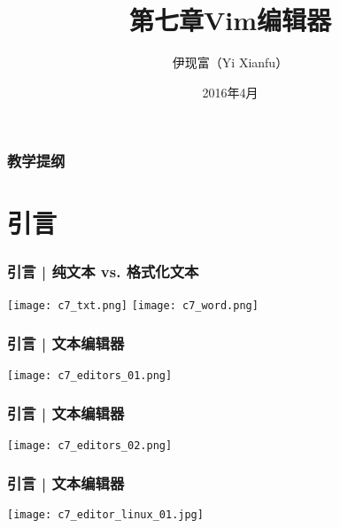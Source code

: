 



\title[Vim]{第七章\quad Vim编辑器}
\author[Yixf]{伊现富（Yi Xianfu）}
\date{2016年4月}


\begin{frame}
  \titlepage
\end{frame}

\begin{frame}[plain,label=current]
  \frametitle{教学提纲}
  \setcounter{tocdepth}{3}
  \begin{multicols}{2}
    \tableofcontents
  \end{multicols}
\end{frame}


\section{引言}
\begin{frame}
  \frametitle{引言 | 纯文本 vs. 格式化文本}
  \begin{center}
    \texttt{[image: c7\_txt.png]}
    \vspace*{0.1cm}
    \texttt{[image: c7\_word.png]}
  \end{center}
\end{frame}

\begin{frame}
  \frametitle{引言 | 文本编辑器}
  \begin{center}
    \texttt{[image: c7\_editors\_01.png]}
  \end{center}
\end{frame}

\begin{frame}
  \frametitle{引言 | 文本编辑器}
  \begin{center}
    \texttt{[image: c7\_editors\_02.png]}
  \end{center}
\end{frame}

\begin{frame}
  \frametitle{引言 | 文本编辑器}
  \begin{center}
    \texttt{[image: c7\_editor\_linux\_01.jpg]}
  \end{center}
\end{frame}

